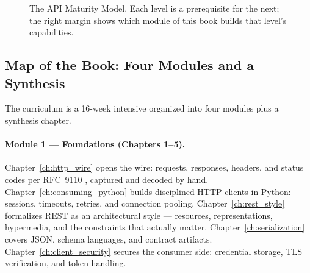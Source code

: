 \begin{figure}[h]
  \centering
  \caption{The API Maturity Model. Each level is a prerequisite for the next;
    the right margin shows which module of this book builds that level's
    capabilities.}
  \label{fig:ch0-maturity}
\end{figure}

\subsection{Map of the Book: Four Modules and a Synthesis}
\label{sec:ch0-depmap}

The curriculum is a 16-week intensive organized into four modules plus a
synthesis chapter.

\paragraph{Module 1 --- Foundations (Chapters 1--5).}
Chapter~\ref{ch:http_wire} opens the wire: requests, responses, headers, and
status codes per RFC~9110 \cite{rfc9110}, captured and decoded by hand.
Chapter~\ref{ch:consuming_python} builds disciplined HTTP clients in Python:
sessions, timeouts, retries, and connection pooling.
Chapter~\ref{ch:rest_style} formalizes REST as an architectural style
\cite{fielding2000rest} --- resources, representations, hypermedia, and the
constraints that actually matter. Chapter~\ref{ch:serialization} covers
JSON, schema languages, and contract artifacts. Chapter~\ref{ch:client_security}
secures the consumer side: credential storage, TLS verification, and token
handling.


